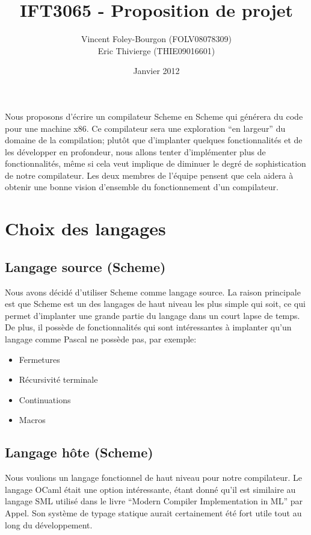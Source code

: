 \documentclass[11pt]{article}
\begin{document}
\title{IFT3065 - Proposition de projet}
\date{Janvier 2012}
\author{Vincent Foley-Bourgon (FOLV08078309) \\
Eric Thivierge (THIE09016601)}
\maketitle

\abstract

Nous proposons d'écrire un compilateur Scheme en Scheme qui générera
du code pour une machine x86.  Ce compilateur sera une exploration
``en largeur'' du domaine de la compilation; plutôt que d'implanter
quelques fonctionnalités et de les développer en profondeur, nous
allons tenter d'implémenter plus de fonctionnalités, même si cela veut
implique de diminuer le degré de sophistication de notre compilateur.
Les deux membres de l'équipe pensent que cela aidera à obtenir une
bonne vision d'ensemble du fonctionnement d'un compilateur.

\section{Choix des langages}

\subsection{Langage source (Scheme)}

Nous avons décidé d'utiliser Scheme comme langage source.  La raison
principale est que Scheme est un des langages de haut niveau les plus
simple qui soit, ce qui permet d'implanter une grande partie du
langage dans un court lapse de temps.  De plus, il possède de
fonctionnalités qui sont intéressantes à implanter qu'un langage comme
Pascal ne possède pas, par exemple:


\begin{itemize}
\item Fermetures
\item Récursivité terminale
\item Continuations
\item Macros
\end{itemize}


\subsection{Langage hôte (Scheme)}

Nous voulions un langage fonctionnel de haut niveau pour notre
compilateur.  Le langage OCaml était une option intéressante, étant
donné qu'il est similaire au langage SML utilisé dans le livre
``Modern Compiler Implementation in ML'' par Appel.  Son système de
typage statique aurait certainement été fort utile tout au long du
développement.
\end{document}
